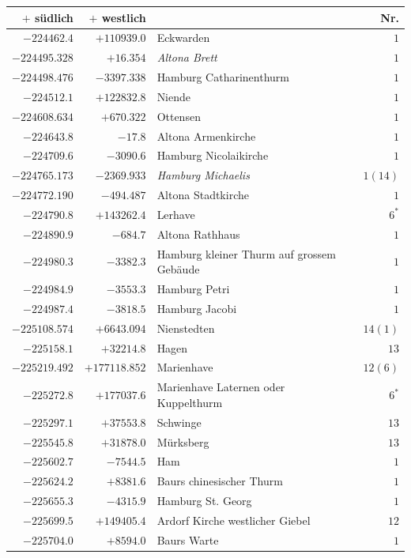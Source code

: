 \clearpage{}%
\begin{center}\begingroup\fontsize{8}{9}\selectfont
\setlength{\tabcolsep}{4pt}
\begin{tabular}{r|r|p{170pt}|r}\hline
\(+\) südlich&\(+\) westlich&&Nr.\\\hline
\(-224462.4\)&\(+110939.0\)&Eckwarden&\(1\)\\
\(-224495.328\)&\(+16.354\)&\textit{Altona Brett}&\(1\)\\
\(-224498.476\)&\(-3397.338\)&Hamburg Catharinenthurm&\(1\)\\
\(-224512.1\)&\(+122832.8\)&Niende&\(1\)\\
\(-224608.634\)&\(+670.322\)&Ottensen&\(1\)\\
\(-224643.8\)&\(-17.8\)&Altona Armenkirche&\(1\)\\
\(-224709.6\)&\(-3090.6\)&Hamburg Nicolaikirche&\(1\)\\
\(-224765.173\)&\(-2369.933\)&\textit{Hamburg Michaelis}&\(1(14)\)\\
\(-224772.190\)&\(-494.487\)&Altona Stadtkirche&\(1\)\\
\(-224790.8\)&\(+143262.4\)&Lerhave&\(6^{*}\)\\
\(-224890.9\)&\(-684.7\)&Altona Rathhaus&\(1\)\\
\(-224980.3\)&\(-3382.3\)&Hamburg kleiner Thurm auf grossem Gebäude&\(1\)\\
\(-224984.9\)&\(-3553.3\)&Hamburg Petri&\(1\)\\
\(-224987.4\)&\(-3818.5\)&Hamburg Jacobi&\(1\)\\
\(-225108.574\)&\(+6643.094\)&Nienstedten&\(14(1)\)\\
\(-225158.1\)&\(+32214.8\)&Hagen&\(13\)\\
\(-225219.492\)&\(+177118.852\)&Marienhave&\(12(6)\)\\
\(-225272.8\)&\(+177037.6\)&Marienhave Laternen oder Kuppelthurm&\(6^{*}\)\\
\(-225297.1\)&\(+37553.8\)&Schwinge&\(13\)\\
\(-225545.8\)&\(+31878.0\)&Mürksberg&\(13\)\\
\(-225602.7\)&\(-7544.5\)&Ham&\(1\)\\
\(-225624.2\)&\(+8381.6\)&Baurs chinesischer Thurm&\(1\)\\
\(-225655.3\)&\(-4315.9\)&Hamburg St. Georg&\(1\)\\
\(-225699.5\)&\(+149405.4\)&Ardorf Kirche westlicher Giebel&\(12\)\\
\(-225704.0\)&\(+8594.0\)&Baurs Warte&\(1\)\\

\end{tabular}
\end{center}
